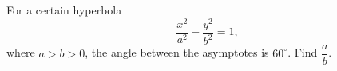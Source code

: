 For a certain hyperbola
\[\dfrac{x^2}{a^2}-\dfrac{y^2}{b^2}=1,\]
where $a>b>0$, the angle between the asymptotes is $60^\circ$. Find $\dfrac ab$.
